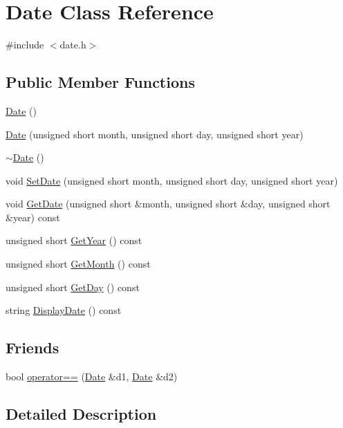 \hypertarget{class_date}{}\section{Date Class Reference}
\label{class_date}


{\ttfamily \#include $<$date.\+h$>$}

\subsection*{Public Member Functions}
\begin{DoxyCompactItemize}
\item 
\hyperlink{class_date_a4e59ed4ba66eec61c27460c5d09fa1bd}{Date} ()
\item 
\hyperlink{class_date_a36cdbafbeae8fbb6c9f348b99f8dd4b6}{Date} (unsigned short month, unsigned short day, unsigned short year)
\item 
\hyperlink{class_date_ade4b469433b7966cc034cbcc6799233b}{$\sim$\+Date} ()
\item 
void \hyperlink{class_date_a164b847fe22bd8dec6a4a7bf8dcfe7f3}{Set\+Date} (unsigned short month, unsigned short day, unsigned short year)
\item 
void \hyperlink{class_date_af559828abe832d63aa18d30032a570b4}{Get\+Date} (unsigned short \&month, unsigned short \&day, unsigned short \&year) const 
\item 
unsigned short \hyperlink{class_date_ac3208f8bc962156453470f7910760f51}{Get\+Year} () const 
\item 
unsigned short \hyperlink{class_date_abaa22858da0eddafd4d6bf801ff5857e}{Get\+Month} () const 
\item 
unsigned short \hyperlink{class_date_abc6a31fd1857241489506c4fd0f369dd}{Get\+Day} () const 
\item 
string \hyperlink{class_date_aec64adfc88126b561b691b83edebc955}{Display\+Date} () const 
\end{DoxyCompactItemize}
\subsection*{Friends}
\begin{DoxyCompactItemize}
\item 
bool \hyperlink{class_date_aa932959bdd56052bc683d29b8748898f}{operator==} (\hyperlink{class_date}{Date} \&d1, \hyperlink{class_date}{Date} \&d2)
\end{DoxyCompactItemize}


\subsection{Detailed Description}


